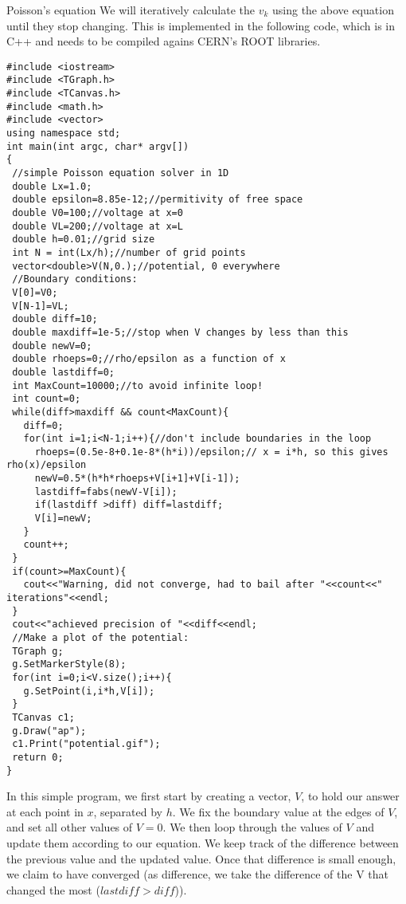\begin{example}{0pt}{Poisson's equation}{}
We will iteratively calculate the $v_k$ using the above equation until they stop changing. This is implemented in the following code, which is in C++ and needs to be compiled agains CERN's ROOT libraries.
\begin{verbatim}
#include <iostream>
#include <TGraph.h>
#include <TCanvas.h>
#include <math.h>
#include <vector>
using namespace std;
int main(int argc, char* argv[])
{
 //simple Poisson equation solver in 1D
 double Lx=1.0;
 double epsilon=8.85e-12;//permitivity of free space
 double V0=100;//voltage at x=0
 double VL=200;//voltage at x=L
 double h=0.01;//grid size
 int N = int(Lx/h);//number of grid points
 vector<double>V(N,0.);//potential, 0 everywhere
 //Boundary conditions:
 V[0]=V0;
 V[N-1]=VL;
 double diff=10;
 double maxdiff=1e-5;//stop when V changes by less than this
 double newV=0;
 double rhoeps=0;//rho/epsilon as a function of x
 double lastdiff=0;
 int MaxCount=10000;//to avoid infinite loop!
 int count=0;
 while(diff>maxdiff && count<MaxCount){
   diff=0;
   for(int i=1;i<N-1;i++){//don't include boundaries in the loop
     rhoeps=(0.5e-8+0.1e-8*(h*i))/epsilon;// x = i*h, so this gives rho(x)/epsilon
     newV=0.5*(h*h*rhoeps+V[i+1]+V[i-1]);
     lastdiff=fabs(newV-V[i]);
     if(lastdiff >diff) diff=lastdiff;
     V[i]=newV;
   }
   count++;
 }
 if(count>=MaxCount){
   cout<<"Warning, did not converge, had to bail after "<<count<<" iterations"<<endl;
 }
 cout<<"achieved precision of "<<diff<<endl;
 //Make a plot of the potential:
 TGraph g;
 g.SetMarkerStyle(8);
 for(int i=0;i<V.size();i++){
   g.SetPoint(i,i*h,V[i]);
 }
 TCanvas c1;
 g.Draw("ap");
 c1.Print("potential.gif");
 return 0;
}
\end{verbatim}
In this simple program, we first start by creating a vector, $V$, to hold our answer at each point in $x$, separated by $h$. We fix the boundary value at the edges of $V$, and set all other values of $V=0$. We then loop through the values of $V$ and update them according to our equation. We keep track of the difference between the previous value and the updated value. Once that difference is small enough, we claim to have converged (as difference, we take the difference of the V that changed the most ($lastdiff>diff$)).
\end{example}
